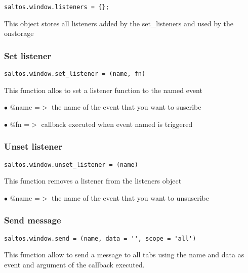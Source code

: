 \documentclass[a4paper]{article}
\begin{document}
\begin{lstlisting}
saltos.window.listeners = {};
\end{lstlisting}

This object stores all listeners added by the set\_listeners and used by the onstorage

\hypertarget{toc866}{}
\subsubsection{Set listener}

\begin{lstlisting}
saltos.window.set_listener = (name, fn)
\end{lstlisting}

This function allos to set a listener function to the named event

\begin{compactitem}
\item[\color{myblue}$\bullet$] @name =$>$ the name of the event that you want to suscribe
\item[\color{myblue}$\bullet$] @fn   =$>$ callback executed when event named is triggered
\end{compactitem}

\hypertarget{toc867}{}
\subsubsection{Unset listener}

\begin{lstlisting}
saltos.window.unset_listener = (name)
\end{lstlisting}

This function removes a listener from the listeners object

\begin{compactitem}
\item[\color{myblue}$\bullet$] @name =$>$ the name of the event that you want to unsuscribe
\end{compactitem}

\hypertarget{toc868}{}
\subsubsection{Send message}

\begin{lstlisting}
saltos.window.send = (name, data = '', scope = 'all')
\end{lstlisting}

This function allow to send a message to all tabs using the name and data
as event and argument of the callback executed.
\end{document}
